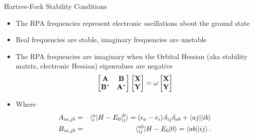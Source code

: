 \documentclass[10pt]{beamer}
\begin{document}
{{{{\begin{frame}{Hartree-Fock Stability Conditions}
	\begin{itemize}[<+->]
		\item{The RPA frequencies represent electronic oscillations about the ground state}
		\item{Real frequencies are stable, imaginary frequencies are unstable}
		\item{The RPA frequencies are imaginary when the \alert{Orbital Hessian} (aka stability matrix, electronic Hessian) eigenvalues are \alert{negative}
			\begin{eqnarray}
				\begin{bmatrix}
					\bf{A}   & \bf{B}   \\
					\bf{B}^* & \bf{A}^* \\
				\end{bmatrix}
				\begin{bmatrix}  \bf{X} \\ \bf{Y}  \end{bmatrix}
				= \omega \begin{bmatrix}  \bf{X} \\ \bf{Y}  \end{bmatrix}
			\end{eqnarray}
		}
		\item{Where}
		\begin{eqnarray}
			A_{ia,jb} &=& \braket{{}_i^a|H-E_0|{}_j^b} = \left(\epsilon_a - \epsilon_i \right) \delta_{ij}\delta_{ab} + \braket{aj||ib}
			\nonumber \\
			B_{ia,jb} &=& \braket{{}_{ij}^{ab}|H-E_0|0} = \braket{ab||ij}.
		\end{eqnarray}
	\end{itemize}
\end{frame}

}}}}
\end{document}
